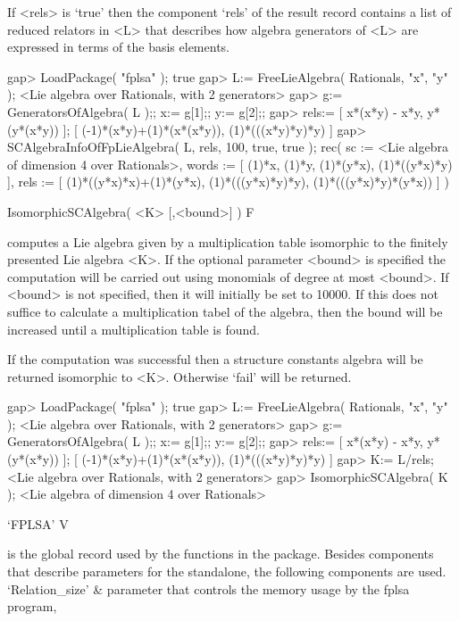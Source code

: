 If <rels> is `true' then the component `rels' of the result record
contains a list of reduced relators in <L> that describes how algebra
generators of <L> are expressed in terms of the basis elements.

\beginexample
gap> LoadPackage( "fplsa" );
true
gap> L:= FreeLieAlgebra( Rationals, "x", "y" );
<Lie algebra over Rationals, with 2 generators>
gap> g:= GeneratorsOfAlgebra( L );; x:= g[1];; y:= g[2];;
gap> rels:= [ x*(x*y) - x*y, y*(y*(x*y)) ];
[ (-1)*(x*y)+(1)*(x*(x*y)), (1)*(((x*y)*y)*y) ]
gap> SCAlgebraInfoOfFpLieAlgebra( L, rels, 100, true, true );
rec( sc := <Lie algebra of dimension 4 over Rationals>, 
  words := [ (1)*x, (1)*y, (1)*(y*x), (1)*((y*x)*y) ], 
  rels := [ (1)*((y*x)*x)+(1)*(y*x), (1)*(((y*x)*y)*y), (1)*(((y*x)*y)*(y*x)) 
     ] )
\endexample

\> IsomorphicSCAlgebra( <K> [,<bound>] )         F

computes a Lie algebra given by a multiplication table isomorphic to the 
finitely presented Lie algebra <K>.
If the optional parameter <bound> is specified the computation will
be carried out using monomials of degree at most <bound>. 
If <bound> is not specified, then it will initially be set to
10000. If this does not suffice to calculate a multiplication tabel
of the algebra, then the bound will be increased until a multiplication
table is found.
  
If the computation was successful then a structure constants algebra
will be returned isomorphic to <K>.
Otherwise `fail' will be returned.

\beginexample
gap> LoadPackage( "fplsa" );
true
gap> L:= FreeLieAlgebra( Rationals, "x", "y" );
<Lie algebra over Rationals, with 2 generators>
gap> g:= GeneratorsOfAlgebra( L );; x:= g[1];; y:= g[2];;
gap> rels:= [ x*(x*y) - x*y, y*(y*(x*y)) ];
[ (-1)*(x*y)+(1)*(x*(x*y)), (1)*(((x*y)*y)*y) ]
gap> K:= L/rels;
<Lie algebra over Rationals, with 2 generators>
gap> IsomorphicSCAlgebra( K );
<Lie algebra of dimension 4 over Rationals>
\endexample



\>`FPLSA' V

is the global record used by the functions in the package.
Besides components that describe parameters for the standalone,
the following components are used.
\beginitems
`Relation_size' & 
       parameter that controls the memory usage by the fplsa program,

